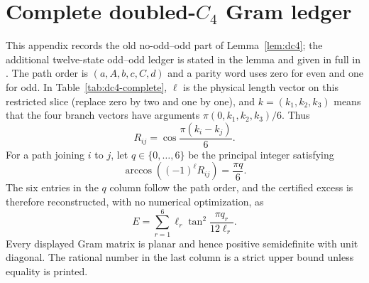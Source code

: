 \documentclass[11pt]{article}
\theoremstyle{remark}
\begin{document}
\appendix
\section{Complete doubled-$C_4$ Gram ledger}\label{app:dc4-ledger}

This appendix records the old no-odd--odd part of Lemma~\ref{lem:dc4}; the
additional twelve-state odd--odd ledger is stated in the lemma and given in
full in \cite{DoubledC4}.  The path order is $(a,A,b,c,C,d)$ and a parity word
uses zero for even and one for odd.  In Table~\ref{tab:dc4-complete}, $\ell$ is
the physical length vector on this restricted slice (replace zero by two and
one by one), and
$k=(k_1,k_2,k_3)$ means that the four branch vectors have arguments
$\pi(0,k_1,k_2,k_3)/6$.  Thus
\[
 R_{ij}=\cos\frac{\pi(k_i-k_j)}6.
\]
For a path joining $i$ to $j$, let $q\in\{0,\ldots,6\}$ be the principal
integer satisfying
\[
 \arccos((-1)^\ell R_{ij})=\frac{\pi q}{6}.
\]
The six entries in the $q$ column follow the path order, and the certified
excess is therefore reconstructed, with no numerical optimization, as
\begin{equation}\label{eq:dc4-ledger-cost}
 E=\sum_{r=1}^6\ell_r\tan^2\frac{\pi q_r}{12\ell_r}.
\end{equation}
Every displayed Gram matrix is planar and hence positive semidefinite with
unit diagonal.  The rational number in the last column is a strict upper
bound unless equality is printed.
\end{document}
